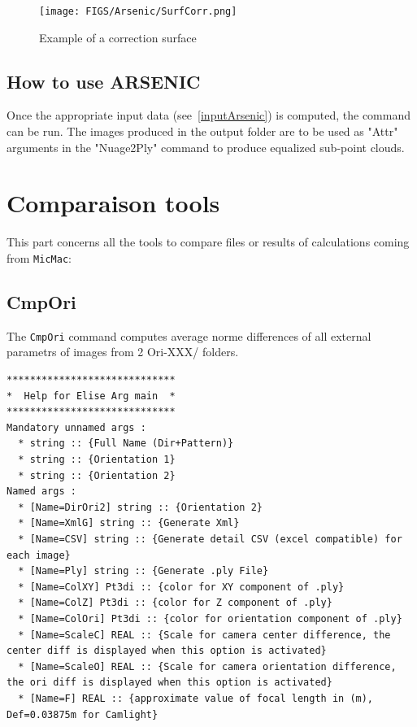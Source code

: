\begin{figure}[H]
\centering
\texttt{[image: FIGS/Arsenic/SurfCorr.png]}
\caption{Example of a correction surface}
\label{SurfCorr}
\end{figure}


\subsection{How to use ARSENIC}

Once the appropriate input data (see~\ref{inputArsenic}) is computed, the command can be run. The images produced in the output folder are to be used as "Attr" arguments in the "Nuage2Ply" command to produce equalized sub-point clouds.

\section{Comparaison tools}
This part concerns all the tools to compare files or results of calculations coming from {\tt MicMac}:

\subsection{CmpOri}
The {\tt CmpOri} command computes average norme differences of all external parametrs of images from 2 Ori-XXX/ folders.

\begin{verbatim}
*****************************
*  Help for Elise Arg main  *
*****************************
Mandatory unnamed args : 
  * string :: {Full Name (Dir+Pattern)}
  * string :: {Orientation 1}
  * string :: {Orientation 2}
Named args : 
  * [Name=DirOri2] string :: {Orientation 2}
  * [Name=XmlG] string :: {Generate Xml}
  * [Name=CSV] string :: {Generate detail CSV (excel compatible) for each image}
  * [Name=Ply] string :: {Generate .ply File}
  * [Name=ColXY] Pt3di :: {color for XY component of .ply}
  * [Name=ColZ] Pt3di :: {color for Z component of .ply}
  * [Name=ColOri] Pt3di :: {color for orientation component of .ply}
  * [Name=ScaleC] REAL :: {Scale for camera center difference, the center diff is displayed when this option is activated}
  * [Name=ScaleO] REAL :: {Scale for camera orientation difference, the ori diff is displayed when this option is activated}
  * [Name=F] REAL :: {approximate value of focal length in (m), Def=0.03875m for Camlight}

\end{verbatim}

